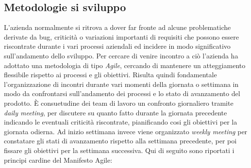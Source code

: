 \subsection{Metodologie si sviluppo}
L'azienda normalmente si ritrova a dover far fronte ad alcune problematiche derivate da bug, criticità o variazioni importanti di requisiti che possono essere riscontrate durante i vari processi aziendali ed incidere in modo significativo sull'andamento dello sviluppo.
Per cercare di venire incontro a ciò l'azienda ha adottato una metodologia di tipo \textit{Agile}, cercando di mantenere un atteggiamento flessibile rispetto ai processi e gli obiettivi. Risulta quindi fondamentale l'organizzazione di incontri durante vari momenti della giornata o settimana in modo da confrontarsi sull'andamento dei processi e lo stato di avanzamento del prodotto. È consuetudine dei team di lavoro un confronto giornaliero tramite \textit{daily meeting}, per discutere su quanto fatto durante la giornata precedente indicando le eventuali criticità riscontrate, pianificando cosi gli obiettivi per la giornata odierna. Ad inizio settimana invece viene organizzato \textit{weekly meeting} per constatare gli stati di avanzamento rispetto alla settimana precedente, per poi fissare gli obiettivi per la settimana successiva.
Qui di seguito sono riportati i principi cardine del Manifesto Agile:
